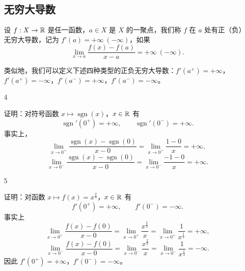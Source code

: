 \subsection{无穷大导数}
	\label{sec:6-1-4}

\begin{mydef*}{}

	设 \(f:X\to\mathbb{R}\) 是任一函数，\(a\in X\) 是 \(X\) 的一聚点，我们称 \(f\) 在 \(a\) 处有正（负）无穷大导数，记为 \(f'(a)=+\infty\ (-\infty)\)，如果
	\[
	\lim_{x\to a}\frac{f(x)-f(a)}{x-a}=+\infty\ (-\infty).
	\]

\end{mydef*}

类似地，我们可以定义下述四种类型的正负无穷大导数：\(f'(a^+)=+\infty\)，\(f'(a^+)=-\infty\)，\(f'(a^-)=+\infty\)，\(f'(a^-)=-\infty\)。

\begin{sourceexample}{4}

	证明：对符号函数 \(x\longmapsto\operatorname{sgn}(x)\)，\(x\in\mathbb{R}\) 有
	\[
	\operatorname{sgn}'(0^+)=+\infty,\qquad\operatorname{sgn}'(0^-)=+\infty.
	\]
	事实上，
	\[
	\lim_{x\to0^+}\frac{\operatorname{sgn}(x)-\operatorname{sgn}(0)}{x-0}=\lim_{x\to0^+}\frac{1-0}{x}=+\infty,
	\]
	\[
	\lim_{x\to0^-}\frac{\operatorname{sgn}(x)-\operatorname{sgn}(0)}{x-0}=\lim_{x\to0^-}\frac{-1-0}{x}=+\infty.
	\]

\end{sourceexample}

\begin{sourceexample}{5}

	证明：对函数 \(x\longmapsto f(x)=x^{\frac23}\)，\(x\in\mathbb{R}\) 有
	\[
	f'(0^+)=+\infty,\qquad f'(0^-)=-\infty.
	\]
	事实上
	\[
	\lim_{x\to0^+}\frac{f(x)-f(0)}{x-0}=\lim_{x\to0^+}\frac{x^{\frac23}}{x}=\lim_{x\to0^+}\frac1{x^{\frac13}}=+\infty,
	\]
	\[
	\lim_{x\to0^-}\frac{f(x)-f(0)}{x-0}=\lim_{x\to0^-}\frac{x^{\frac23}}{x}=\lim_{x\to0^-}\frac1{x^{\frac13}}=-\infty.
	\]
	因此 \(f'(0^+)=+\infty\)，\(f'(0^-)=-\infty\)。

\end{sourceexample}

\begin{figure}[htbp]
	\centering
	\caption{}
	\label{fig:6-4}
\end{figure}

